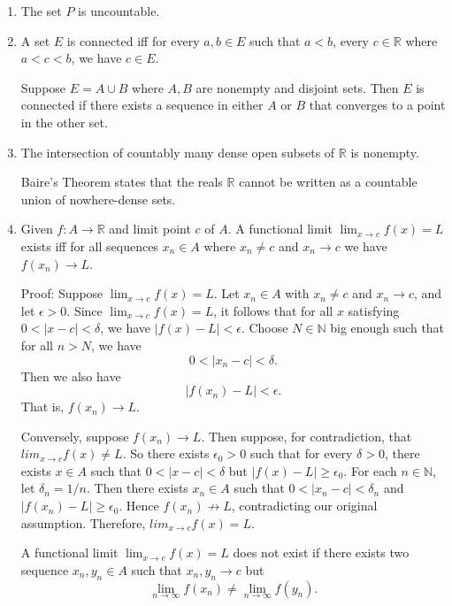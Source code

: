 \documentclass[12pt]{article}
\begin{document}
\begin{enumerate}[label=(\alph*)]
    \item The set \( P \) is uncountable.

    \item A set \( E \) is connected iff for every \(a, b \in E\) such that \( a < b\), every \( c \in \mathbb{R} \) where  \( a < c < b\), we have \(c \in E\).

          Suppose \( E = A \cup B\) where \(A, B\) are nonempty and disjoint sets. Then \( E \) is connected if there exists a sequence in either \( A \) or \( B\) that converges to a point in the other set.

    \item The intersection of countably many dense open subsets of \( \mathbb{R} \) is nonempty.

          Baire's Theorem states that the reals \( \mathbb{R} \) cannot be written as a countable union of nowhere-dense sets.

    \item Given \(f: A \to \mathbb{R} \) and limit point \(c\) of \(A\).
          A functional limit \( \lim_{x \to c} f(x) = L \) exists iff for all sequences \( x_n \in A \) where \(x_n \neq c\) and \(x_n \to c \) we have \( f(x_n) \to L\).

          Proof: Suppose \( \lim_{x \to c} f(x) = L \). Let \( x_n \in A \) with \(x_n \neq c\) and \(x_n \to c \), and let \( \epsilon > 0 \). Since \( \lim_{x \to c} f(x) = L \), it follows that for all \(x\) satisfying \( 0 < | x - c | < \delta \), we have \( | f(x) - L | < \epsilon \). Choose \(N \in \mathbb{N} \) big enough such that for all \( n > N \), we have
          \[
              0 < | x_n - c| < \delta.
          \]
          Then we also have
          \[
              | f(x_n) - L | < \epsilon.
          \]
          That is, \( f(x_n) \to L\).

          Conversely, suppose  \( f(x_n) \to L\). Then suppose, for contradiction, that \( lim_{x \to c} f(x) \neq L \). So there exists \( \epsilon_0 > 0\) such that for every \( \delta > 0 \), there exists \(x \in A\) such that \( 0 < | x - c| < \delta \) but \( |f(x) - L | \geq \epsilon_0 \). For each \( n \in \mathbb{N} \), let
          \(\delta_n = 1/n\). Then there exists \(x_n \in A\) such that \( 0 < | x_n - c| < \delta_n \) and \( |f(x_n) - L | \geq \epsilon_0 \). Hence \(f(x_n) \not \to L\), contradicting our original assumption. Therefore, \( lim_{x \to c} f(x) = L \).

          A functional limit \( \lim_{x \to c} f(x) = L \) does not exist if there exists two sequence \( x_n, y_n \in A\) such that \(x_n,y_n \to c\) but
          \[
              \lim_{n \to \infty} f(x_n) \neq \lim_{n \to \infty} f(y_n).
          \]


\end{enumerate}
\end{document}
